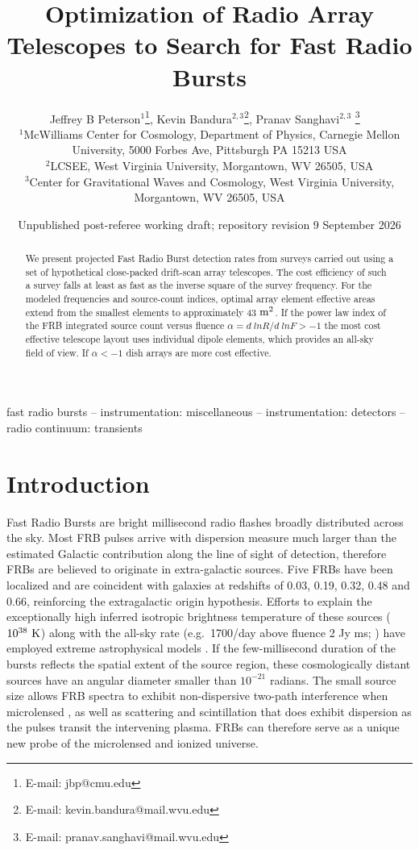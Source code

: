 \documentclass[fleqn,usenatbib]{mnras}
\title{Optimization of Radio Array Telescopes to Search for Fast Radio Bursts}
\author[Peterson J. B. et al.]{
Jeffrey B Peterson$^{1}$\thanks{E-mail: jbp@cmu.edu },
Kevin Bandura$^{2,3}$\thanks{E-mail: kevin.bandura@mail.wvu.edu },
Pranav Sanghavi$^{2,3}$ \thanks{E-mail: pranav.sanghavi@mail.wvu.edu}
\
\\
$^{1}$McWilliams Center for Cosmology, Department of Physics, Carnegie Mellon University, 5000 Forbes Ave, Pittsburgh PA 15213 USA\\
$^{2}$LCSEE, West Virginia University, Morgantown, WV 26505, USA\\
$^{3}$Center for Gravitational Waves and Cosmology, West Virginia University, Morgantown, WV 26505, USA
}
\date{Unpublished post-referee working draft; repository revision 9 September 2026}
\begin{document}
\label{firstpage}
\pagerange{\pageref{firstpage}--\pageref{lastpage}}
\maketitle

\begin{abstract}
We present projected Fast Radio Burst detection rates from surveys carried out using a set of hypothetical close-packed drift-scan array telescopes. The cost efficiency of such a survey falls at least as fast as the inverse square of the survey frequency. For the modeled frequencies and source-count indices, optimal array element effective areas extend from the smallest elements to approximately 43 $\rm{m^2}$.  If the power law index of the FRB integrated source count versus fluence $\alpha = d ~ln R/d ~ln F > -1$ the most cost effective telescope layout uses individual dipole elements, which provides an all-sky field of view. If $\alpha <-1$ dish arrays are more cost effective.

\end{abstract}

\begin{keywords}
fast radio bursts -- instrumentation: miscellaneous -- instrumentation: detectors -- radio continuum: transients
\end{keywords}

\section{Introduction}
Fast Radio Bursts are bright millisecond radio flashes broadly distributed across the sky. Most FRB pulses arrive with dispersion measure much larger than the estimated Galactic contribution along the line of sight of detection, therefore FRBs are believed to originate in extra-galactic sources.
Five FRBs \citep{2017ApJ...834L...7T,2016PASA...33...45P} have been localized and are coincident with galaxies at redshifts of 0.03, 0.19, 0.32, 0.48 and 0.66, reinforcing the extragalactic origin hypothesis.
Efforts to explain the exceptionally high inferred isotropic brightness temperature of these sources ($10^{38} \rm{~K}$) along with the all-sky rate (e.g.\ 1700/day above fluence 2 Jy ms; \citealt{parkes2018}) have employed extreme astrophysical models \citep{review1, review2}. If the few-millisecond duration of the bursts reflects the spatial extent of the source region, these cosmologically distant sources have an angular diameter smaller than $10^{-21}$ radians. The small source size allows FRB spectra to exhibit non-dispersive two-path interference when microlensed \citep{2019BAAS...51c.420R}, as well as scattering and scintillation that does exhibit dispersion as the pulses transit the intervening plasma. FRBs can therefore serve as a unique new probe of the microlensed and ionized universe.
\end{document}
